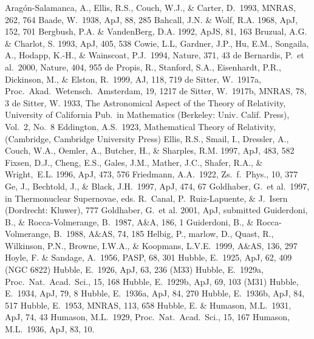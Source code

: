 \documentclass[preprint]{aastex}
\begin{document}
\begin{thebibliography}{}

\bibitem[]{} Arag\'on-Salamanca, A., Ellis, R.S., Couch, W.J., \&
Carter, D.\ 1993, MNRAS, 262, 764
\bibitem[]{}Baade, W.\ 1938, ApJ, 88, 285
\bibitem[]{}Bahcall, J.N. \& Wolf, R.A. 1968, ApJ, 152, 701
\bibitem[]{}Bergbush, P.A. \& VandenBerg, D.A. 1992, ApJS, 81, 163
\bibitem[]{}Bruzual, A.G. \& Charlot, S. 1993, ApJ, 405, 538 
\bibitem[]{}Cowie, L.L, Gardner, J.P., Hu, E.M., Songaila, A., Hodapp,
K.-H., \& Wainscoat, P.J.\ 1994, Nature, 371, 43
\bibitem[]{} de Bernardis, P.\ et al.\ 2000, Nature, 404, 955 
\bibitem[]{}de Propis, R., Stanford, S.A., Eisenhardt, P.R.,
Dickinson, M., \& Elston, R.\ 1999, AJ, 118, 719
\bibitem[]{}de Sitter, W.\ 1917a, Proc.\ Akad.\ Wetensch.\ Amsterdam, 19, 1217
\bibitem[]{}de Sitter, W.\ 1917b, MNRAS, 78, 3 
\bibitem[]{}de Sitter, W. 1933, The Astronomical Aspect of the Theory
of Relativity, University of California Pub.\ in Mathematics
(Berkeley: Univ. Calif. Press), Vol.\ 2, No.\ 8
\bibitem[]{}Eddington, A.S.\ 1923, Mathematical Theory of Relativity,
(Cambridge, Cambridge University Press)
\bibitem[]{} Ellis, R.S., Smail, I., Dressler, A., Couch, W.A.,
Oemler, A., Butcher, H., \& Sharples, R.M. 1997, ApJ, 483, 582
\bibitem[]{}Fixsen, D.J., Cheng, E.S., Gales, J.M., Mather, J.C.,
Shafer, R.A., \& Wright,\ E.L. 1996, ApJ, 473, 576
\bibitem[]{}Friedmann, A.A.\ 1922, Zs.\ f.\ Phys., 10, 377
\bibitem[]{}Ge, J., Bechtold, J., \& Black, J.H.\ 1997, ApJ, 474, 67
\bibitem[]{}Goldhaber, G.\ et al.\ 1997, in Thermonuclear Supernovae,
eds. R.\ Canal, P.\ Ruiz-Lapuente, \& J.\ Isern (Dordrecht: Kluwer),
777
\bibitem[]{}Goldhaber, G.\ et al. 2001, ApJ, submitted
\bibitem[]{}Guiderdoni, B., \& Rocca-Volmerange, B.\ 1987, A\&A, 186, 1
\bibitem[]{}Guiderdoni, B., \& Rocca-Volmerange, B.\ 1988, A\&AS, 74, 185
\bibitem[]{}Helbig, P., marlow, D., Quast, R., Wilkinson, P.N.,
Browne, I.W.A., \& Koopmans, L.V.E.\ 1999, A\&AS, 136, 297
\bibitem[]{}Hoyle, F. \& Sandage, A.\ 1956, PASP, 68, 301
\bibitem[]{}Hubble, E.\ 1925, ApJ, 62, 409 (NGC 6822)
\bibitem[]{}Hubble, E.\ 1926, ApJ, 63, 236 (M33)
\bibitem[]{}Hubble, E.\ 1929a, Proc.\ Nat.\ Acad.\ Sci., 15, 168
\bibitem[]{}Hubble, E.\ 1929b, ApJ, 69, 103 (M31)
\bibitem[]{}Hubble, E.\ 1934, ApJ, 79, 8
\bibitem[]{}Hubble, E.\ 1936a, ApJ, 84, 270
\bibitem[]{}Hubble, E.\ 1936b, ApJ, 84, 517
\bibitem[]{}Hubble, E.\ 1953, MNRAS, 113, 658
\bibitem[]{}Hubble, E. \& Humason, M.L.\ 1931, ApJ, 74, 43
\bibitem[]{}Humason, M.L.\ 1929, Proc.\ Nat.\ Acad.\ Sci., 15, 167
\bibitem[]{}Humason, M.L.\ 1936, ApJ, 83, 10.  

\end{thebibliography}
\end{document}
